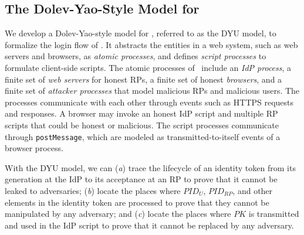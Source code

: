 

\subsection{The Dolev-Yao-Style Model for \usso}
\label{dy-model}

We develop a Dolev-Yao-style model \cite{SPRESSO} for \usso, referred to as the DYU model, to formalize the login flow of \usso. %
It abstracts the entities in a web system, such as web servers and browsers, as \emph{atomic processes}, %
and defines \emph{script processes} to formulate client-side scripts.
The atomic processes of \usso~include an {\em IdP process}, a finite set of {\em web servers} for honest RPs, a finite set of honest {\em browsers}, and a finite set of {\em attacker processes} that model malicious RPs and malicious users. 
The processes communicate with each other through events such as HTTPS requests and responses. A browser may invoke an honest IdP script and multiple RP scripts that could be honest or malicious.
The script processes communicate through \verb+postMessage+, which are modeled as transmitted-to-itself events of a browser process.

With the DYU model, we can (\emph{a}) trace the lifecycle of an identity token from its generation at the IdP to its acceptance at an RP to prove that it cannot be leaked to adversaries; (\emph{b}) locate the places where $PID_U$, $PID_{RP}$, and other elements in the identity token are processed to prove that they cannot be manipulated by any adversary; and (\emph{c}) locate the places where $PK$ is transmitted and used in the IdP script to prove that it cannot be replaced by any adversary.

